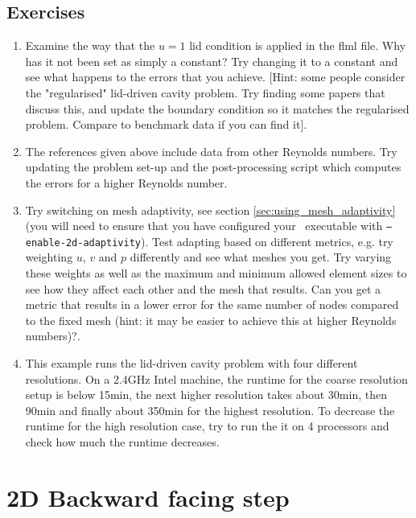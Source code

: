 \subsection{Exercises}
\begin{enumerate}
\item Examine the way that the $u=1$ lid condition is applied in the flml file. Why has it not been set as simply a constant?
Try changing it to a constant and see what happens to the errors that you achieve. [Hint: some people consider the "regularised"
lid-driven cavity problem. Try finding some papers that discuss this, and update the boundary condition so it matches the
regularised problem. Compare to benchmark data if you can find it].
\item The references given above include data from other Reynolds numbers. Try updating the problem set-up and the post-processing script which computes
the errors for a higher Reynolds number.
\item Try switching on mesh adaptivity, see section \ref{sec:using_mesh_adaptivity} (you will need to ensure that you have configured your \fluidity\ executable with \texttt{--enable-2d-adaptivity}).
Test adapting based on different metrics, e.g. try weighting $u$, $v$ and $p$
differently and see what meshes you get. Try varying these weights as well as the maximum and minimum allowed element
sizes to see how they affect each other and the mesh that results. Can you get a metric that results in a lower
error for the same number of nodes compared to the fixed mesh (hint: it may be easier to achieve this at higher Reynolds numbers)?.
\item This example runs the lid-driven cavity problem with four different resolutions. On a 2.4GHz Intel machine, the runtime for the coarse resolution setup is below 15min, the next higher resolution takes about 30min, then 90min and finally about 350min for the highest resolution. To decrease the runtime for the high resolution case, try to run the it on 4 processors and check how much the runtime decreases.
\end{enumerate}



\section{2D Backward facing step}
\label{sec:backward_facing_step_2d}


